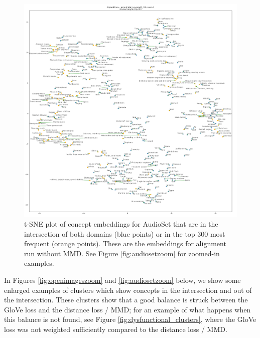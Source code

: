 \begin{figure}[H]
    \centering
    \includegraphics[width=\textwidth]{images/results/intersection_top300_tsne_audioset_probabilistic_sup_mmd0_150_AlignedGlove_1.png}
    \caption{
        \label{fig:audiosetaligned}
        t-SNE plot of concept embeddings for AudioSet that are in the intersection of both domains (blue points) or in the top 300 most frequent (orange points). These are the embeddings for alignment run without MMD. See Figure \ref{fig:audiosetzoom} for zoomed-in examples. 
    }
\end{figure}

In Figures \ref{fig:openimageszoom} and \ref{fig:audiosetzoom} below, we show some enlarged examples of clusters which show concepts in the intersection and out of the intersection. These clusters show that a good balance is struck between the GloVe loss and the distance loss / MMD; for an example of what happens when this balance is not found, see Figure \ref{fig:dysfunctional_clusters}, where the GloVe loss was not weighted sufficiently compared to the distance loss / MMD. 


